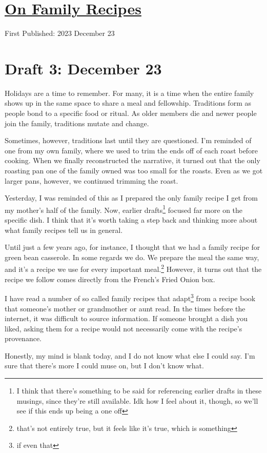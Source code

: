 \documentclass[12pt]{article}[titlepage]
\newcommand{\1}{\={a}}
\newcommand{\2}{\={e}}
\newcommand{\3}{\={\i}}
\newcommand{\4}{\=o}
\newcommand{\5}{\=u}
\newcommand{\6}{\={A}}
\renewcommand{\,}{\textsuperscript{,}}
\begin{document}
\doublespacing
\section{\href{family-recipes.html}{On Family Recipes}}
First Published: 2023 December 23

\section{Draft 3: December 23}
Holidays are a time to remember.
For many, it is a time when the entire family shows up in the same space to share a meal and fellowship.
Traditions form as people bond to a specific food or ritual.
As older members die and newer people join the family, traditions mutate and change.

Sometimes, however, traditions last until they are questioned.
I'm reminded of one from my own family, where we used to trim the ends off of each roast before cooking.
When we finally reconstructed the narrative, it turned out that the only roasting pan one of the family owned was too small for the roasts.
Even as we got larger pans, however, we continued trimming the roast.

Yesterday, I was reminded of this as I prepared the only family recipe I get from my mother's half of the family.
Now, earlier drafts\footnote{I think that there's something to be said for referencing earlier drafts in these musings, since they're still available. Idk how I feel about it, though, so we'll see if this ends up being a one off} focused far more on the specific dish.
I think that it's worth taking a step back and thinking more about what family recipes tell us in general.

Until just a few years ago, for instance, I thought that we had a family recipe for green bean casserole.
In some regards we do.
We prepare the meal the same way, and it's a recipe we use for every important meal.\footnote{that's not entirely true, but it feels like it's true, which is something}
However, it turns out that the recipe we follow comes directly from the French's Fried Onion box.

I have read a number of so called family recipes that adapt\footnote{if even that} from a recipe book that someone's mother or grandmother or aunt read.
In the times before the internet, it was difficult to source information.
If someone brought a dish you liked, asking them for a recipe would not necessarily come with the recipe's provenance.

Honestly, my mind is blank today, and I do not know what else I could say.
I'm sure that there's more I could muse on, but I don't know what.
\end{document}
